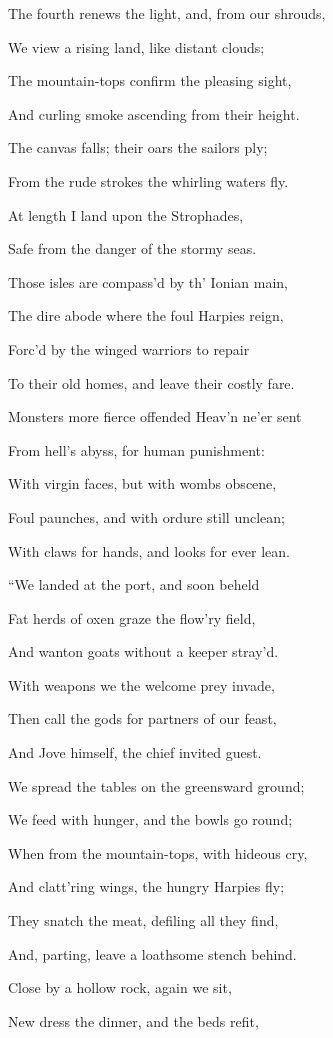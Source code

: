 The fourth renews the light, and, from our shrouds,

We view a rising land, like distant clouds;

The mountain-tops confirm the pleasing sight,

And curling smoke ascending from their height.

The canvas falls; their oars the sailors ply;

From the rude strokes the whirling waters fly.

At length I land upon the Strophades,

Safe from the danger of the stormy seas.

Those isles are compass’d by th’ Ionian main,

The dire abode where the foul Harpies reign,

Forc’d by the winged warriors to repair

To their old homes, and leave their costly fare.

Monsters more fierce offended Heav’n ne’er sent

From hell’s abyss, for human punishment:

With virgin faces, but with wombs obscene,

Foul paunches, and with ordure still unclean;

With claws for hands, and looks for ever lean.

“We landed at the port, and soon beheld

Fat herds of oxen graze the flow’ry field,

And wanton goats without a keeper stray’d.

With weapons we the welcome prey invade,

Then call the gods for partners of our feast,

And Jove himself, the chief invited guest.

We spread the tables on the greensward ground;

We feed with hunger, and the bowls go round;

When from the mountain-tops, with hideous cry,

And clatt’ring wings, the hungry Harpies fly;

They snatch the meat, defiling all they find,

And, parting, leave a loathsome stench behind.

Close by a hollow rock, again we sit,

New dress the dinner, and the beds refit,

